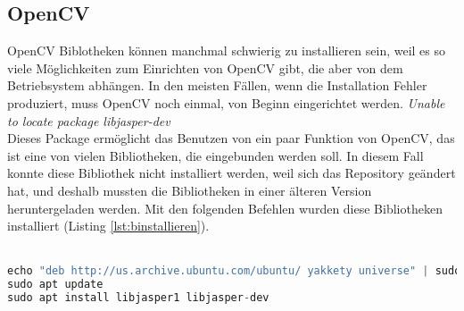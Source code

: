 \subsection{OpenCV}
OpenCV Biblotheken können manchmal schwierig zu installieren sein, weil es so viele Möglichkeiten zum Einrichten von OpenCV gibt, die aber von dem Betriebsystem abhängen. In den meisten Fällen, wenn die Installation Fehler produziert, muss OpenCV noch einmal, von Beginn eingerichtet werden.
\bigbreak
\textit{Unable to locate package libjasper-dev}\\
Dieses Package ermöglicht das Benutzen von ein paar Funktion von OpenCV, das ist eine von vielen Bibliotheken, die eingebunden werden soll. In diesem Fall konnte diese Bibliothek nicht installiert werden, weil sich das Repository geändert hat, und deshalb mussten die Bibliotheken in einer älteren Version heruntergeladen werden. Mit den folgenden Befehlen wurden diese Bibliotheken installiert (Listing \ref{lst:binstallieren}).\\\\
\begin{lstlisting}[language=Python, caption={Bibliothek installieren}, label={lst:binstallieren}]
echo "deb http://us.archive.ubuntu.com/ubuntu/ yakkety universe" | sudo tee -a /etc/apt/sources.list
sudo apt update
sudo apt install libjasper1 libjasper-dev
\end{lstlisting}
